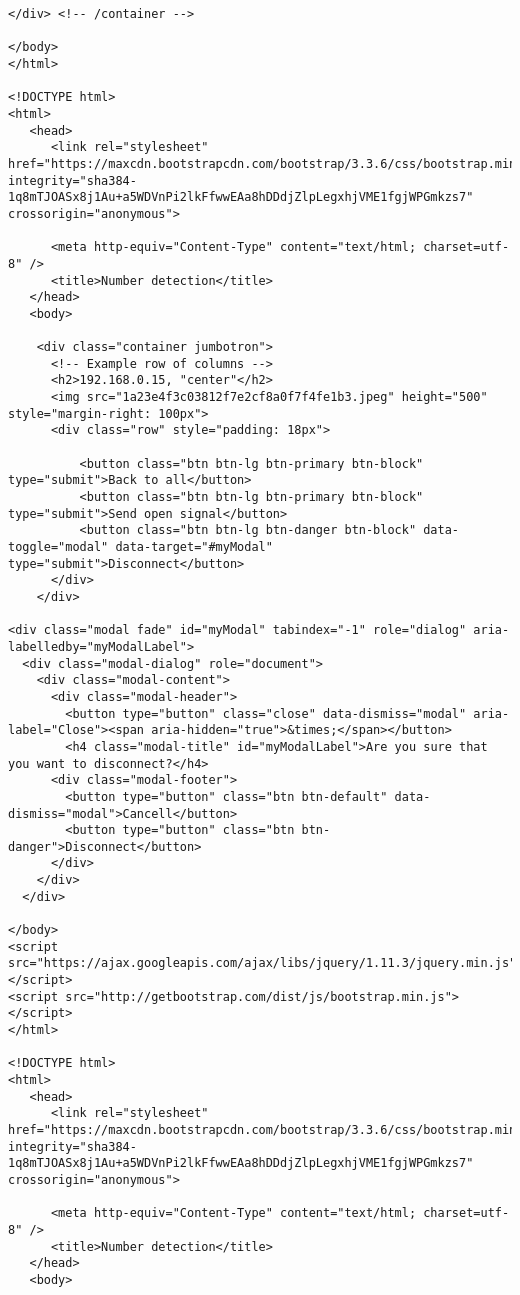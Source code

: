\begin{lstlisting}[style=fsharpstyle,caption={Исходный код}, label=lst:recognition_result_handler]
    </div> <!-- /container -->  

</body>
</html>

<!DOCTYPE html>
<html>
   <head>
      <link rel="stylesheet" href="https://maxcdn.bootstrapcdn.com/bootstrap/3.3.6/css/bootstrap.min.css" integrity="sha384-1q8mTJOASx8j1Au+a5WDVnPi2lkFfwwEAa8hDDdjZlpLegxhjVME1fgjWPGmkzs7" crossorigin="anonymous">

      <meta http-equiv="Content-Type" content="text/html; charset=utf-8" />
      <title>Number detection</title>
   </head>
   <body>

    <div class="container jumbotron">
      <!-- Example row of columns -->
      <h2>192.168.0.15, "center"</h2>
      <img src="1a23e4f3c03812f7e2cf8a0f7f4fe1b3.jpeg" height="500" style="margin-right: 100px">
      <div class="row" style="padding: 18px">

          <button class="btn btn-lg btn-primary btn-block" type="submit">Back to all</button>
          <button class="btn btn-lg btn-primary btn-block" type="submit">Send open signal</button>
          <button class="btn btn-lg btn-danger btn-block" data-toggle="modal" data-target="#myModal" type="submit">Disconnect</button>
      </div>
    </div>

<div class="modal fade" id="myModal" tabindex="-1" role="dialog" aria-labelledby="myModalLabel">
  <div class="modal-dialog" role="document">
    <div class="modal-content">
      <div class="modal-header">
        <button type="button" class="close" data-dismiss="modal" aria-label="Close"><span aria-hidden="true">&times;</span></button>
        <h4 class="modal-title" id="myModalLabel">Are you sure that you want to disconnect?</h4>
      <div class="modal-footer">
        <button type="button" class="btn btn-default" data-dismiss="modal">Cancell</button>
        <button type="button" class="btn btn-danger">Disconnect</button>
      </div>
    </div>
  </div>

</body>
<script src="https://ajax.googleapis.com/ajax/libs/jquery/1.11.3/jquery.min.js"></script>
<script src="http://getbootstrap.com/dist/js/bootstrap.min.js"></script>
</html>

<!DOCTYPE html>
<html>
   <head>
      <link rel="stylesheet" href="https://maxcdn.bootstrapcdn.com/bootstrap/3.3.6/css/bootstrap.min.css" integrity="sha384-1q8mTJOASx8j1Au+a5WDVnPi2lkFfwwEAa8hDDdjZlpLegxhjVME1fgjWPGmkzs7" crossorigin="anonymous">

      <meta http-equiv="Content-Type" content="text/html; charset=utf-8" />
      <title>Number detection</title>
   </head>
   <body>


\end{lstlisting}
